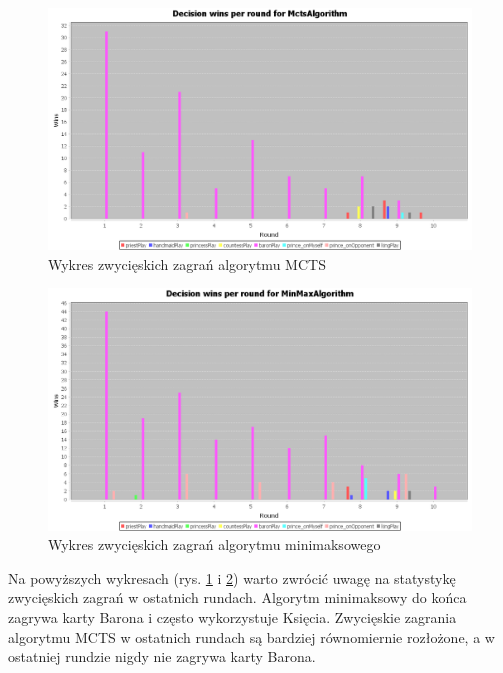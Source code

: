 \begin{figure}[H]
	\centering
	\includegraphics[width=\textwidth]{Resources/MirrorMmVsMcts/MctsVsMmDecision.PNG}
	\caption{Wykres zwycięskich zagrań algorytmu MCTS} 
	\label{fig:MctsVsMmDecision}
\end{figure} 

\begin{figure}[H]
	\centering
	\includegraphics[width=\textwidth]{Resources/MirrorMmVsMcts/MmVsMctsDecision.PNG}
	\caption{Wykres zwycięskich zagrań algorytmu minimaksowego} 
	\label{fig:MmVsMctsDecision}
\end{figure} 

Na powyższych wykresach (rys. \ref{fig:MctsVsMmDecision} i  \ref{fig:MmVsMctsDecision}) warto zwrócić uwagę na statystykę zwycięskich zagrań w ostatnich rundach. Algorytm minimaksowy do końca zagrywa karty Barona i często wykorzystuje Księcia. Zwycięskie zagrania algorytmu MCTS w ostatnich rundach są bardziej równomiernie rozłożone, a w ostatniej rundzie nigdy nie zagrywa karty Barona.

